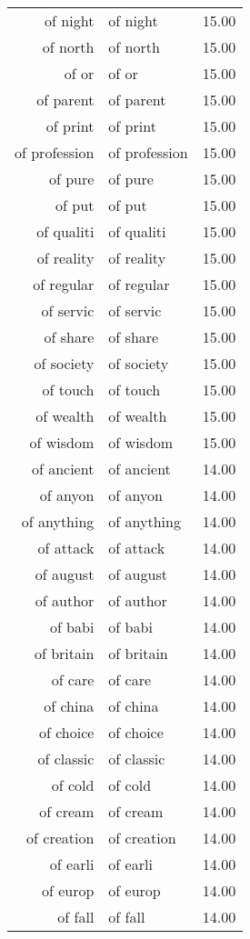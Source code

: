 \begin{table}[ht]
\begin{tabular}{rlr}
  of night & of night & 15.00 \\ 
  of north & of north & 15.00 \\ 
  of or & of or & 15.00 \\ 
  of parent & of parent & 15.00 \\ 
  of print & of print & 15.00 \\ 
  of profession & of profession & 15.00 \\ 
  of pure & of pure & 15.00 \\ 
  of put & of put & 15.00 \\ 
  of qualiti & of qualiti & 15.00 \\ 
  of reality & of reality & 15.00 \\ 
  of regular & of regular & 15.00 \\ 
  of servic & of servic & 15.00 \\ 
  of share & of share & 15.00 \\ 
  of society & of society & 15.00 \\ 
  of touch & of touch & 15.00 \\ 
  of wealth & of wealth & 15.00 \\ 
  of wisdom & of wisdom & 15.00 \\ 
  of ancient & of ancient & 14.00 \\ 
  of anyon & of anyon & 14.00 \\ 
  of anything & of anything & 14.00 \\ 
  of attack & of attack & 14.00 \\ 
  of august & of august & 14.00 \\ 
  of author & of author & 14.00 \\ 
  of babi & of babi & 14.00 \\ 
  of britain & of britain & 14.00 \\ 
  of care & of care & 14.00 \\ 
  of china & of china & 14.00 \\ 
  of choice & of choice & 14.00 \\ 
  of classic & of classic & 14.00 \\ 
  of cold & of cold & 14.00 \\ 
  of cream & of cream & 14.00 \\ 
  of creation & of creation & 14.00 \\ 
  of earli & of earli & 14.00 \\ 
  of europ & of europ & 14.00 \\ 
  of fall & of fall & 14.00 \\ 

\end{tabular}
\end{table}
